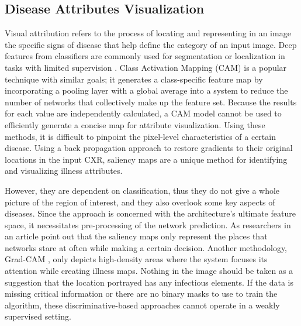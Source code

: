\subsection{Disease Attributes Visualization}
{
Visual attribution refers to the process of locating and representing in an image the specific signs of disease that help define the category of an input image. Deep features from classifiers are commonly used for segmentation or localization in tasks with limited supervision \cite{25}. Class Activation Mapping (CAM) \cite{26} is a popular technique with similar goals; it generates a class-specific feature map by incorporating a pooling layer with a global average into a system to reduce the number of networks that collectively make up the feature set. Because the results for each value are independently calculated, a CAM model cannot be used to efficiently generate a concise map for attribute visualization. Using these methods, it is difficult to pinpoint the pixel-level characteristics of a certain disease. Using a back propagation approach to restore gradients to their original locations in the input CXR, saliency maps are a unique method for identifying and visualizing illness attributes.

However, they are dependent on classification, thus they do not give a whole picture of the region of interest, and they also overlook some key aspects of diseases. Since the approach is concerned with the architecture's ultimate feature space, it necessitates pre-processing of the network prediction. As researchers in an article \cite{27} point out that the saliency maps only represent the places that networks stare at often while making a certain decision. Another methodology, Grad-CAM \cite{28}, only depicts high-density areas where the system focuses its attention while creating illness maps. Nothing in the image should be taken as a suggestion that the location portrayed has any infectious elements. If the data is missing critical information or there are no binary masks to use to train the algorithm, these discriminative-based approaches cannot operate in a weakly supervised setting.

}

